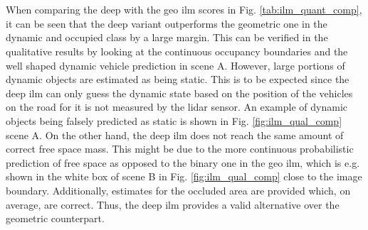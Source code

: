 \\\\
When comparing the deep with the geo \gls{ilm} scores in Fig. \ref{tab:ilm_quant_comp}, it can be seen that the deep variant outperforms the geometric one in the dynamic and occupied class by a large margin. This can be verified in the qualitative results by looking at the continuous occupancy boundaries and the well shaped dynamic vehicle prediction in scene A. However, large portions of dynamic objects are estimated as being static. This is to be expected since the deep \gls{ilm} can only guess the dynamic state based on the position of the vehicles on the road for it is not measured by the lidar sensor. An example of dynamic objects being falsely predicted as static is shown in Fig. \ref{fig:ilm_qual_comp} scene A. On the other hand, the deep \gls{ilm} does not reach the same amount of correct free space mass. This might be due to the more continuous probabilistic prediction of free space as opposed to the binary one in the geo \gls{ilm}, which is e.g. shown in the white box of scene B in Fig. \ref{fig:ilm_qual_comp} close to the image boundary. Additionally, estimates for the occluded area are provided which, on average, are correct. Thus, the deep \gls{ilm} provides a valid alternative over the geometric counterpart.
